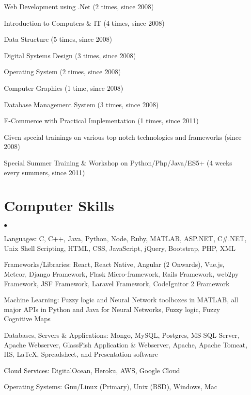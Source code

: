 \documentclass[margin,line]{res}
\newenvironment{list2}{
  \begin{list}{$\bullet$}{%
      \setlength{\itemsep}{0in}
      \setlength{\parsep}{0in} \setlength{\parskip}{0in}
      \setlength{\topsep}{0in} \setlength{\partopsep}{0in}
      \setlength{\leftmargin}{0.2in}}}{\end{list}}
\begin{document}
\begin{resume}
Web Development using .Net (2 times, since 2008)

Introduction to Computers \& IT (4 times, since 2008)

Data Structure (5 times, since 2008)

Digital Systems Design (3 times, since 2008)

Operating System (2 times, since 2008)

Computer Graphics (1 time, since 2008)

Database Management System (3 times, since 2008)

E-Commerce with Practical Implementation (1 times, since 2011)

Given special trainings on various top notch technologies and frameworks (since 2008)

Special Summer Training \& Workshop on Python/Php/Java/ES5+ (4 weeks every summers, since 2011)

\section{\sc Computer Skills}
\begin{list2}
\item Languages:  C, C++, Java, Python, Node, Ruby, MATLAB, ASP.NET, C\#.NET, Unix Shell Scripting, HTML, CSS, JavaScript, jQuery, Bootstrap, PHP, XML\\
\item Frameworks/Libraries: React, React Native, Angular (2 Onwards), Vue.js, Meteor, Django Framework, Flask Micro-framework, Rails Framework, web2py Framework, JSF Framework, Laravel Framework, CodeIgnitor 2 Framework\\
\item Machine Learning: Fuzzy logic and Neural Network toolboxes in MATLAB, all major APIs in Python and Java for Neural Networks, Fuzzy logic, Fuzzy Cognitive Maps  
\item Databases, Servers \& Applications: Mongo, MySQL, Postgres, MS-SQL Server, Apache Webserver, GlassFish Application \& Webserver, Apache, Apache Tomcat, IIS, \LaTeX, Spreadsheet, and Presentation software\\
\item Cloud Services: DigitalOcean, Heroku, AWS, Google Cloud\\
\item Operating Systems:  Gnu/Linux (Primary), Unix (BSD), Windows, Mac\\
\end{list2}


\end{resume}
\end{document}
